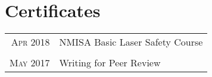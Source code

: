 \section{Certificates}

\begin{tabular}{rl}
	\textsc{Apr} 2018 & NMISA Basic Laser Safety Course \\
	& \\
	\textsc{May} 2017 & Writing for Peer Review
\end{tabular}